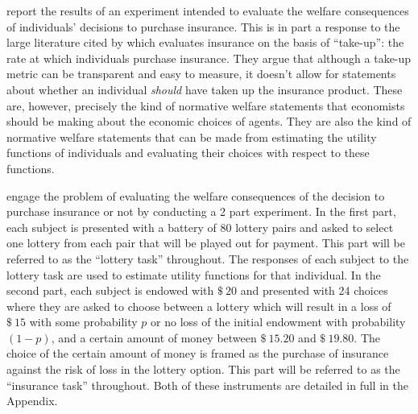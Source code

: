 \documentclass[11pt,a4paper]{report}
\newcommand{\money}[1]{$\$\!\:#1$}          %
\begin{document}
\textcite{Harrison2016} report the results of an experiment intended to evaluate the welfare consequences of individuals' decisions to purchase insurance.
This is in part a response to the large literature cited by \textcite[1]{Harrison2016} which evaluates insurance on the basis of \enquote{take-up}: the rate at which individuals purchase insurance.
They argue that although a take-up metric can be transparent and easy to measure, it doesn't allow for statements about whether an individual \textit{should} have taken up the insurance product.
These are, however, precisely the kind of normative welfare statements that economists should be making about the economic choices of agents.
They are also the kind of normative welfare statements that can be made from estimating the utility functions of individuals and evaluating their choices with respect to these functions.


\textcite{Harrison2016} engage the problem of evaluating the welfare consequences of the decision to purchase insurance or not by conducting a 2 part experiment.
In the first part, each subject is presented with a battery of 80 lottery pairs and asked to select one lottery from each pair that will be played out for payment.
This part will be referred to as the \enquote{lottery task} throughout.
The responses of each subject to the lottery task are used to estimate utility functions for that individual.
In the second part, each subject is endowed with \money{20} and presented with 24 choices where they are asked to choose between a lottery which will result in a loss of \money{15} with some probability $p$ or no loss of the initial endowment with probability $(1-p)$, and a certain amount of money between \money{15.20} and \money{19.80}.
The choice of the certain amount of money is framed as the purchase of insurance against the risk of loss in the lottery option.
This part will be referred to as the \enquote{insurance task} throughout.
Both of these instruments are detailed in full in the Appendix.
\end{document}
